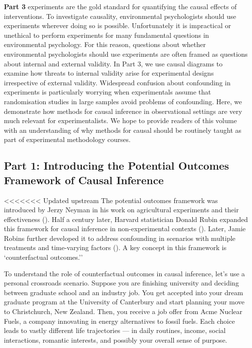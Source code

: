 \documentclass[
  singlecolumn]{article}
\begin{document}
\textbf{Part 3} experiments are the gold standard for quantifying the
causal effects of interventions. To investigate causality, environmental
psychologists should use experiments wherever doing so is possible.
Unfortunately it is impractical or unethical to perform experiments for
many fundamental questions in environmental psychology. For this reason,
questions about whether environmental psychologists should use
experiments are often framed as questions about internal and external
validity. In Part 3, we use causal diagrams to examine how threats to
internal validity arise for experimental designs irrespective of
external validity. Widespread confusion about confounding in experiments
is particularly worrying when experimentals assume that randomisation
studies in large samples avoid problems of confounding. Here, we
demonstrate how methods for causal inference in observational settings
are very much relevant for experimentalists. We hope to provide readers
of this volume with an understanding of why methods for causal should be
routinely taught as part of experimental methodology courses.

\subsection{Part 1: Introducing the Potential Outcomes Framework of
Causal
Inference}\label{part-1-introducing-the-potential-outcomes-framework-of-causal-inference}

<<<<<<< Updated upstream
The potential outcomes framework was introduced by Jerzy Neyman in his
work on agricultural experiments and their effectiveness
(). Half a century later, Harvard
statistician Donald Rubin expanded this framework for causal inference
in non-experimental contexts ().
Later, Jamie Robins further developed it to address confounding in
scenarios with multiple treatments and time-varying factors
(). A key concept in this
framework is `counterfactual outcomes.''

To understand the role of counterfactual outcomes in causal inference,
let's use a personal crossroads scenario. Suppose you are finishing
university and deciding between graduate school and an industry job. You
get accepted into your dream graduate program at the University of
Canterbury and start planning your move to Christchurch, New Zealand.
Then, you receive a job offer from Acme Nuclear Fuels, a company
innovating in energy alternatives to fossil fuels. Each choice leads to
vastly different life trajectories --- in daily routines, income, social
interactions, romantic interests, and possibly your overall sense of
purpose.
\end{document}
